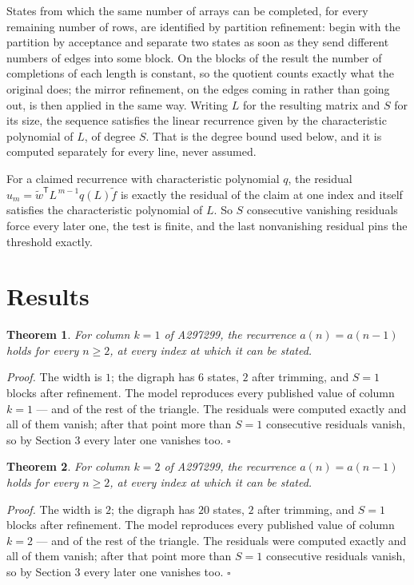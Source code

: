 \documentclass[11pt]{article}
\newtheorem{theorem}{Theorem}
\theoremstyle{definition}
\begin{document}
States from which the same number of arrays can be completed, for every remaining number of rows, are identified by partition refinement: begin with the partition by acceptance and separate two states as soon as they send different numbers of edges into some block. On the blocks of the result the number of completions of each length is constant, so the quotient counts exactly what the original does; the mirror refinement, on the edges coming in rather than going out, is then applied in the same way. Writing $L$ for the resulting matrix and $S$ for its size, the sequence satisfies the linear recurrence given by the characteristic polynomial of $L$, of degree $S$. That is the degree bound used below, and it is computed separately for every line, never assumed.

For a claimed recurrence with characteristic polynomial $q$, the residual $u_m = \tilde w^{\mathsf T}L^{\,m-1}q(L)\tilde f$ is exactly the residual of the claim at one index and itself satisfies the characteristic polynomial of $L$. So $S$ consecutive vanishing residuals force every later one, the test is finite, and the last nonvanishing residual pins the threshold exactly.

\section{Results}

\begin{theorem} For column $k = 1$ of A297299, the recurrence $a(n) = a(n-1)$ holds for every $n \ge 2$, at every index at which it can be stated.\end{theorem}

{\itshape Proof.} The width is $1$; the digraph has $6$ states, $2$ after trimming, and $S = 1$ blocks after refinement. The model reproduces every published value of column $k = 1$ --- and of the rest of the triangle. The residuals were computed exactly and all of them vanish; after that point more than $S = 1$ consecutive residuals vanish, so by Section 3 every later one vanishes too. $\square$

\begin{theorem} For column $k = 2$ of A297299, the recurrence $a(n) = a(n-1)$ holds for every $n \ge 2$, at every index at which it can be stated.\end{theorem}

{\itshape Proof.} The width is $2$; the digraph has $20$ states, $2$ after trimming, and $S = 1$ blocks after refinement. The model reproduces every published value of column $k = 2$ --- and of the rest of the triangle. The residuals were computed exactly and all of them vanish; after that point more than $S = 1$ consecutive residuals vanish, so by Section 3 every later one vanishes too. $\square$
\end{document}
